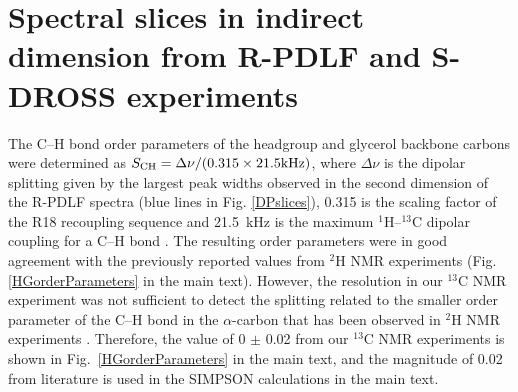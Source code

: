 \documentclass[journal=jpcbfk,manuscript=article]{achemso}
\begin{document}
\pagebreak
\section{Spectral slices in indirect dimension from R-PDLF and S-DROSS experiments}

The C--H bond order parameters of the headgroup and glycerol backbone carbons were determined 
as $S_{\rm CH}=\Delta\nu/(0.315\times21.5  {\rm kHz})$, where $\Delta\nu$ is the dipolar splitting
given by the largest peak widths observed in the second dimension of the R-PDLF spectra
(blue lines in Fig. \ref{DPslices}), 0.315 is the scaling factor of the R18 recoupling sequence 
and 21.5~kHz is the maximum $^1$H--$^{13}$C dipolar coupling for a C--H bond \cite{dvinskikh04}.
The resulting order parameters were in good agreement with the previously reported values
from $^2$H NMR experiments \cite{browning80} (Fig. \ref{HGorderParameters} in the main text).
However, the resolution in our $^{13}$C NMR experiment was not sufficient to detect
the splitting related to the smaller order parameter of the C--H bond in the $\alpha$-carbon
that has been
observed in $^2$H NMR experiments \cite{browning80}. Therefore, the value of  0 $\pm$ 0.02 from our
$^{13}$C NMR experiments is shown in Fig.~\ref{HGorderParameters} in the main text,
and the magnitude of 0.02 from literature is used in the SIMPSON calculations in the main text.
\end{document}
